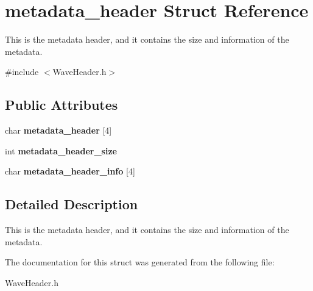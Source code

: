 \hypertarget{structmetadata__header}{}\section{metadata\+\_\+header Struct Reference}
\label{structmetadata__header}


This is the metadata header, and it contains the size and information of the metadata.  




{\ttfamily \#include $<$Wave\+Header.\+h$>$}

\subsection*{Public Attributes}
\begin{DoxyCompactItemize}
\item 
\mbox{\label{structmetadata__header_ae79376f0ab4c3ef1be815dc51a4ad479}} 
char {\bfseries metadata\+\_\+header} \mbox{[}4\mbox{]}
\item 
\mbox{\label{structmetadata__header_a9e8db26863ddbec52db57a8c46c87875}} 
int {\bfseries metadata\+\_\+header\+\_\+size}
\item 
\mbox{\label{structmetadata__header_a8660929d9c6b99723f88e1de7d67426a}} 
char {\bfseries metadata\+\_\+header\+\_\+info} \mbox{[}4\mbox{]}
\end{DoxyCompactItemize}


\subsection{Detailed Description}
This is the metadata header, and it contains the size and information of the metadata. 

The documentation for this struct was generated from the following file\+:\begin{DoxyCompactItemize}
\item 
Wave\+Header.\+h\end{DoxyCompactItemize}
